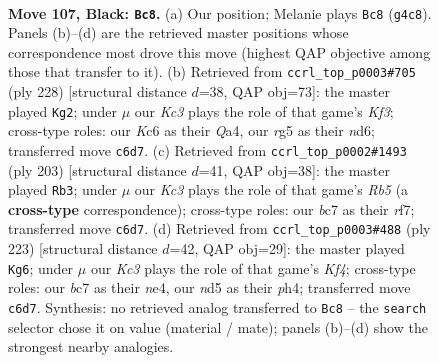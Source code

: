\documentclass[11pt]{article}
\begin{document}
\clearpage

\begin{figure}[p]\centering
\begin{subfigure}{0.46\textwidth}\centering
\resizebox{\linewidth}{!}{%
\newchessgame
\chessboard[
  setfen={8/2B5/PPk5/3N2R1/1K4b1/7p/8/8 b - - 2 107},
  showmover=false,
  pgfstyle=straightmove, color=movearrow, markmove={g4-c8}
]}
\caption{}
\end{subfigure}\hfill
\begin{subfigure}{0.46\textwidth}\centering
\resizebox{\linewidth}{!}{%
\newchessgame
\chessboard[
  setfen={8/4k3/3n4/8/Q3n3/5Kp1/5b2/8 w - - 10 115},
  showmover=false,
  pgfstyle=straightmove, color=movearrow, markmove={f3-g2}
]}
\caption{}
\end{subfigure}
\\[4pt]
\begin{subfigure}{0.46\textwidth}\centering
\resizebox{\linewidth}{!}{%
\newchessgame
\chessboard[
  setfen={8/5R2/8/3K2kP/1r3N2/8/8/8 b - - 36 102},
  showmover=false,
  pgfstyle=straightmove, color=movearrow, markmove={b4-b3}
]}
\caption{}
\end{subfigure}\hfill
\begin{subfigure}{0.46\textwidth}\centering
\resizebox{\linewidth}{!}{%
\newchessgame
\chessboard[
  setfen={8/7p/8/5k2/4Np1P/3K1P2/5B1r/8 b - - 82 112},
  showmover=false,
  pgfstyle=straightmove, color=movearrow, markmove={f5-g6}
]}
\caption{}
\end{subfigure}
\caption{\textbf{Move 107, Black: \texttt{Bc8}.} (a) Our position; Melanie plays \texttt{Bc8} (\texttt{g4c8}). Panels (b)--(d) are the retrieved master positions whose correspondence most drove this move (highest QAP objective among those that transfer to it). (b) Retrieved from \texttt{ccrl\_top\_p0003\#705} (ply 228) [structural distance $d$=38, QAP obj=73]: the master played \texttt{Kg2}; under $\mu$ our \emph{Kc3} plays the role of that game's \emph{Kf3}; cross-type roles: our \emph{K}c6 as their \emph{Q}a4, our \emph{r}g5 as their \emph{n}d6; transferred move \texttt{c6d7}. (c) Retrieved from \texttt{ccrl\_top\_p0002\#1493} (ply 203) [structural distance $d$=41, QAP obj=38]: the master played \texttt{Rb3}; under $\mu$ our \emph{Kc3} plays the role of that game's \emph{Rb5} (a \textbf{cross-type} correspondence); cross-type roles: our \emph{b}c7 as their \emph{r}f7; transferred move \texttt{c6d7}. (d) Retrieved from \texttt{ccrl\_top\_p0003\#488} (ply 223) [structural distance $d$=42, QAP obj=29]: the master played \texttt{Kg6}; under $\mu$ our \emph{Kc3} plays the role of that game's \emph{Kf4}; cross-type roles: our \emph{b}c7 as their \emph{n}e4, our \emph{n}d5 as their \emph{p}h4; transferred move \texttt{c6d7}. Synthesis: no retrieved analog transferred to \texttt{Bc8} -- the \texttt{search} selector chose it on value (material / mate); panels (b)--(d) show the strongest nearby analogies.}
\label{fig:thought-m213}
\end{figure}
\end{document}
